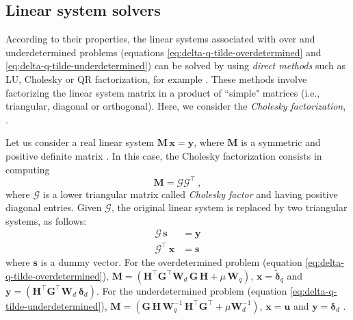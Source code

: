 \documentclass[utf8]{FrontiersinHarvard} %
\begin{document}
	\subsection{Linear system solvers}
	\label{subsec:linear-system-solvers}
	
	According to their properties, the linear systems associated with over and underdetermined problems 
	(equations \ref{eq:delta-q-tilde-overdetermined} and \ref{eq:delta-q-tilde-underdetermined}) can be solved 
	by using \textit{direct methods} such as LU, Cholesky or QR factorization, for example \citep[][sections 3.2, 4.2 and 5.2]{golub-vanloan2013}.
	These methods involve factorizing the linear system matrix in a product of ``simple" matrices 
	(i.e., triangular, diagonal or orthogonal). Here, we consider the \textit{Cholesky factorization}, 
	\citep[][p. 163]{golub-vanloan2013}.
	
	Let us consider a real linear system $\mathbf{M} \, \mathbf{x} = \mathbf{y}$, where 
	$\mathbf{M}$ is a symmetric and positive definite matrix \citep[][p. 159]{golub-vanloan2013}.
	In this case, the Cholesky factorization consists in computing 
	\begin{equation}
		\mathbf{M} = \boldsymbol{\mathcal{G}} \boldsymbol{\mathcal{G}}^{\top} \: ,
		\label{eq:Cholesky-factorization}
	\end{equation}
	where $\boldsymbol{\mathcal{G}}$ is a lower triangular matrix called \textit{Cholesky factor} and having positive diagonal entries.
	Given $\boldsymbol{\mathcal{G}}$, the original linear system is replaced by two triangular systems, as follows:
	\begin{equation}
		\begin{split}
			\boldsymbol{\mathcal{G}} \, \mathbf{s} &= \mathbf{y} \\
			\boldsymbol{\mathcal{G}}^{\top} \, \mathbf{x} &= \mathbf{s}
		\end{split}
		\label{eq:Cholesky-solver}
	\end{equation}
	where $\mathbf{s}$ is a dummy vector.
	For the overdetermined problem (equation \ref{eq:delta-q-tilde-overdetermined}), 
	$\mathbf{M} = \left( \mathbf{H}^{\top} \mathbf{G}^{\top} \mathbf{W}_{d} \, \mathbf{G} \, \mathbf{H} + 
	\mu \, \mathbf{W}_{q} \right)$, $\mathbf{x} = \tilde{\boldsymbol{\delta}}_{q}$ and
	$\mathbf{y} = \left( \mathbf{H}^{\top} \mathbf{G}^{\top} \mathbf{W}_{d} \: \boldsymbol{\delta}_{d} \right)$.
	For the underdetermined problem (equation \ref{eq:delta-q-tilde-underdetermined}),
	$\mathbf{M} = \left( \mathbf{G} \, \mathbf{H} \, \mathbf{W}_{q}^{-1} \,
	\mathbf{H}^{\top}\mathbf{G}^{\top} + \mu \mathbf{W}_{d}^{-1} \right)$, $\mathbf{x} = \mathbf{u}$ and
	$\mathbf{y} = \boldsymbol{\delta}_{d}$ .
	
\end{document}
